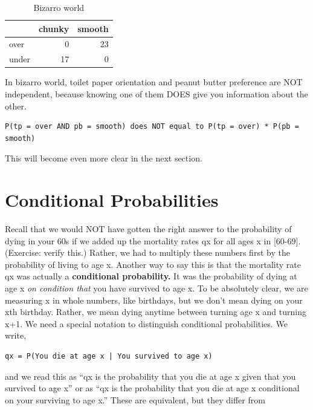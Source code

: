 \documentclass[openany]{book}
\begin{document}
\begin{table}[!h]

\caption{\label{tab:tpxpb-reprise}Bizarro world}
\centering
\begin{tabular}[t]{lrr}
\toprule
  & chunky & smooth\\
\midrule
over & 0 & 23\\
under & 17 & 0\\
\bottomrule
\end{tabular}
\end{table}

In bizarro world, toilet paper orientation and peanut butter preference are NOT independent, because knowing one of them DOES give you information about the other.

\begin{verbatim}
P(tp = over AND pb = smooth) does NOT equal to P(tp = over) * P(pb = smooth)
\end{verbatim}

This will become even more clear in the next section.

\hypertarget{conditional-probabilities}{%
\section*{Conditional Probabilities}\label{conditional-probabilities}}

Recall that we would NOT have gotten the right answer to the probability of dying in your 60s if we added up the mortality rates qx for all ages x in {[}60-69{]}. (Exercise: verify this.) Rather, we had to multiply these numbers first by the probability of living to age x. Another way to say this is that the mortality rate qx was actually a \textbf{conditional probability.} It was the probability of dying at age x \emph{on condition that} you have survived to age x. To be absolutely clear, we are measuring x in whole numbers, like birthdays, but we don't mean dying on your xth birthday. Rather, we mean dying anytime between turning age x and turning x+1. We need a special notation to distinguish conditional probabilities. We write,

\begin{verbatim}
qx = P(You die at age x | You survived to age x)
\end{verbatim}

and we read this as ``qx is the probability that you die at age x given that you survived to age x'' or as ``qx is the probability that you die at age x conditional on your surviving to age x.'' These are equivalent, but they differ from
\end{document}
